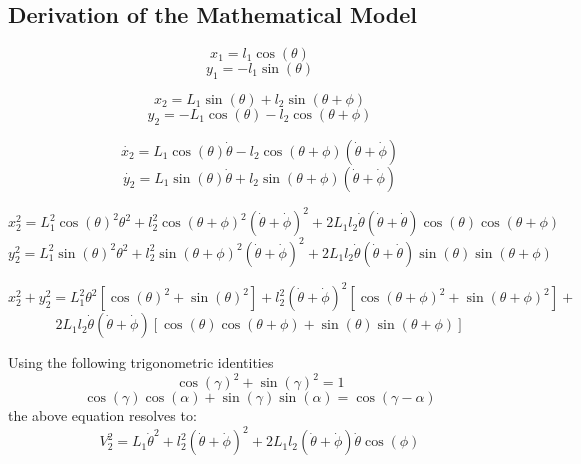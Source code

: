 \chapter{}

\label{chp2:concept_model}

\section{Derivation of the Mathematical Model}
\label{sec:math_model}

$$x_{1}= l_{1}\cos(\theta)$$
$$y_{1} = -l_{1}\sin(\theta)$$

$$x_{2} = L_{1}\sin(\theta) + l_{2}\sin(\theta + \phi)$$
$$y_{2} = -L_{1}\cos(\theta) - l_{2}\cos(\theta + \phi)$$

$$\dot{x_{2}} = L_{1}\cos(\theta)\dot{\theta} - l_{2}\cos(\theta+\phi)(\dot{\theta}+\dot{\phi}) $$
$$\dot{y_{2}} = L_{1}\sin(\theta)\dot{\theta}+l_{2}\sin(\theta+\phi)(\dot{\theta}+\dot{\phi})$$

$$x_{2}^2 = L_{1}^2\cos(\theta)^2\theta^2 +l_{2}^2\cos(\theta+\phi)^2(\dot{\theta}+\dot{\phi})^2 + 2L_{1}l_{2}\dot{\theta}(\dot{\theta}+\dot{\theta})\cos(\theta)\cos(\theta+\phi)$$
$$y_{2}^2 = L_{1}^2\sin(\theta)^2\theta^2 +l_{2}^2\sin(\theta+\phi)^2(\dot{\theta}+\dot{\phi})^2 + 2L_{1}l_{2}\dot{\theta}(\dot{\theta}+\dot{\theta})\sin(\theta)\sin(\theta+\phi)$$

$$x_{2}^2+y_{2}^2 = L_{1}^2\theta^2[\cos(\theta)^2+\sin(\theta)^2]+l_{2}^2(\dot{\theta}+\dot{\phi})^2[\cos(\theta+\phi)^2+\sin(\theta+\phi)^2] +$$
$$ 2L_{1}l_{2}\dot{\theta}(\dot{\theta}+\dot{\phi})[\cos(\theta)\cos(\theta+\phi)+\sin(\theta)\sin(\theta+\phi)]$$	

Using the following trigonometric identities $$ \cos(\gamma)^2 + \sin(\gamma)^2 = 1 $$ 
$$ \cos(\gamma)\cos(\alpha)+\sin(\gamma)\sin(\alpha) = \cos(\gamma - \alpha) $$ the above equation resolves to: $$ V_{2}^2 = L_{1}\dot{\theta}^2+l_{2}^2(\dot{\theta}+\dot{\phi})^2 + 
2L_{1}l_{2}(\dot{\theta}+\dot{\phi})\dot{\theta}\cos(\phi)$$

